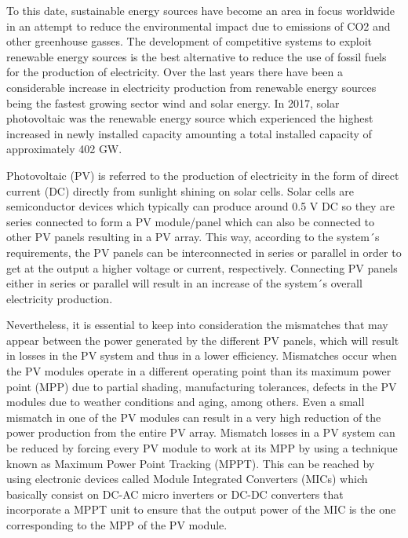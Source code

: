 
To this date, sustainable energy sources have become an area in focus worldwide in an attempt to reduce the environmental impact due to emissions of CO2 and other greenhouse gasses. The development of competitive systems to exploit renewable energy sources is the best alternative to reduce the use of fossil fuels for the production of electricity. Over the last years there have been a considerable increase in electricity production from renewable energy sources being the fastest growing sector wind and solar energy. In 2017, solar photovoltaic was the renewable energy source which experienced the highest increased in newly installed capacity amounting a total installed capacity of approximately 402 GW. %

Photovoltaic (PV) is referred to the production of electricity in the form of direct current (DC) directly from sunlight shining on solar cells. Solar cells are semiconductor devices which typically can produce around 0.5 V DC so they are series connected to form a PV module/panel which can also be connected to other PV panels resulting in a PV array. This way, according to the system´s requirements, the PV panels can be interconnected in series or parallel in order to get at the output a higher voltage or current, respectively. Connecting PV panels either in series or parallel will result in an increase of the system´s overall electricity production. %

Nevertheless, it is essential to keep into consideration the mismatches that may appear between the power generated by the different PV panels, which will result in losses in the PV system and thus in a lower efficiency. Mismatches occur when the PV modules operate in a different operating point than its maximum power point (MPP) due to partial shading, manufacturing tolerances, defects in the PV modules due to weather conditions and aging, among others. Even a small mismatch in one of the PV modules can result in a very high reduction of the power production from the entire PV array. Mismatch losses in a PV system can be reduced by forcing every PV module to work at its MPP by using a technique known as Maximum Power Point Tracking (MPPT). This can be reached by using electronic devices called Module Integrated Converters (MICs) which basically consist on DC-AC micro inverters or DC-DC converters that incorporate a MPPT unit to ensure that the output power of the MIC is the one corresponding to the MPP of the PV module.%

